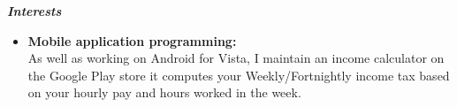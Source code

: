 \documentclass{res}
\begin{document}
\begin{resume}
\begin{itemize}
 \end{itemize}
 \vspace{0.2in} 
 {\sl \textbf{Interests}}
  
   \begin{itemize} \itemsep -2pt %
   \item \textbf{Mobile application programming:} \\ \hfill As well as working
   on Android for Vista, I maintain an income calculator on the Google Play store
   it computes your Weekly/Fortnightly income tax based on your hourly pay
   and hours worked in the week.
 \end{itemize}
 
 
 
 

 
\end{resume} 
\end{document}
